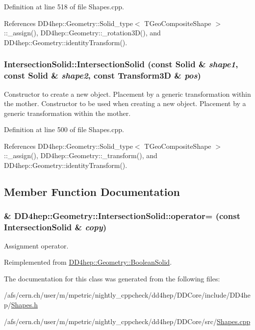 Definition at line 518 of file Shapes.cpp.

References DD4hep::Geometry::Solid\_\-type$<$ TGeoCompositeShape $>$::\_\-assign(), DD4hep::Geometry::\_\-rotation3D(), and DD4hep::Geometry::identityTransform().\hypertarget{class_d_d4hep_1_1_geometry_1_1_intersection_solid_a07ed67ab3e7435dc62ecf109475a0d8d}{
\subsubsection[{IntersectionSolid}]{\setlength{\rightskip}{0pt plus 5cm}IntersectionSolid::IntersectionSolid (const {\bf Solid} \& {\em shape1}, \/  const {\bf Solid} \& {\em shape2}, \/  const {\bf Transform3D} \& {\em pos})}}
\label{class_d_d4hep_1_1_geometry_1_1_intersection_solid_a07ed67ab3e7435dc62ecf109475a0d8d}


Constructor to create a new object. Placement by a generic transformation within the mother. Constructor to be used when creating a new object. Placement by a generic transformation within the mother. 

Definition at line 500 of file Shapes.cpp.

References DD4hep::Geometry::Solid\_\-type$<$ TGeoCompositeShape $>$::\_\-assign(), DD4hep::Geometry::\_\-transform(), and DD4hep::Geometry::identityTransform().

\subsection{Member Function Documentation}
\hypertarget{class_d_d4hep_1_1_geometry_1_1_intersection_solid_a728f2962e5548d8dd9eee9dad0ec6705}{
\subsubsection[{operator=}]{\& DD4hep::Geometry::IntersectionSolid::operator= (const {\bf IntersectionSolid} \& {\em copy})}}
\label{class_d_d4hep_1_1_geometry_1_1_intersection_solid_a728f2962e5548d8dd9eee9dad0ec6705}


Assignment operator. 

Reimplemented from \hyperlink{class_d_d4hep_1_1_geometry_1_1_boolean_solid_a454e550eb5ec2c515b1c38bc8dc54914}{DD4hep::Geometry::BooleanSolid}.

The documentation for this class was generated from the following files:\begin{DoxyCompactItemize}
\item 
/afs/cern.ch/user/m/mpetric/nightly\_\-cppcheck/dd4hep/DDCore/include/DD4hep/\hyperlink{_shapes_8h}{Shapes.h}\item 
/afs/cern.ch/user/m/mpetric/nightly\_\-cppcheck/dd4hep/DDCore/src/\hyperlink{_shapes_8cpp}{Shapes.cpp}\end{DoxyCompactItemize}
